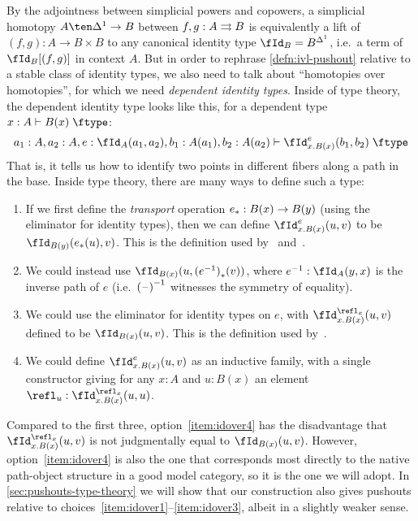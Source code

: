 \documentclass[referee]{psp}
\let\Id\fId
\let\type\fibtype
\renewcommand{\idover}[4][]{\fId_{#1}^{#4}(#2,#3)}
\begin{document}
By the adjointness between simplicial powers and copowers, a simplicial homotopy $A\ten\ivl \to B$ between $f,g:A\rightrightarrows B$ is equivalently a lift of $(f,g):A\to B\times B$ to any canonical identity type $\Id_B = B^\ivl$, i.e.\ a term of $\Id_B[(f,g)]$ in context $A$.
But in order to rephrase \cref{defn:ivl-pushout} relative to a stable class of identity types, we also need to talk about ``homotopies over homotopies'', for which we need \emph{dependent identity types}.
Inside of type theory, the dependent identity type looks like this, for a dependent type $x:A \types B(x)\type$:
\[ a_1:A, a_2:A, e:\id[A]{a_1}{a_2}, b_1:A(a_1), b_2:A(a_2) \types \idover[x.B(x)]{b_1}{b_2}{e} \type \]
That is, it tells us how to identify two points in different fibers along a path in the base.
Inside type theory, there are many ways to define such a type:
\begin{enumerate}\label{idover}
\item If we first define the \emph{transport} operation ${e}_{*}:B(x) \to B(y)$ (using the eliminator for identity types), then we can define $\idover[x.B(x)]{u}{v}{e}$ to be $\id[B(y)]{\transf{e}(u)}{v}$.
  This is the definition used by~\cite{hottbook} and~\cite{hottcoq,bglsss:hottcoq}.\label{item:idover1}
\item We could instead use $\id[B(x)]{u}{\transf{(\opp{e})}(v)}$, where $\opp{e}:\id[A]{y}{x}$ is the inverse path of $e$ (i.e.\ $\mathord{{(\mathord{\hspace{1pt}\text{--}\hspace{1pt}})}^{-1}}$ witnesses the symmetry of equality).\label{item:idover2}
\item We could use the eliminator for identity types on $e$, with $\idover[x.B(x)]{u}{v}{\refl_x}$ defined to be $\id[B(x)]{u}{v}$.
  This is the definition used by~\cite{hottagda}.\label{item:idover3}
\item We could define $\idover[x.B(x)]{u}{v}{e}$ as an inductive family, with a single constructor giving for any $x:A$ and $u:B(x)$ an element $\refl_u : \idover[x.B(x)]{u}{u}{\refl_x}$.\label{item:idover4}
\end{enumerate}
Compared to the first three, option~\ref{item:idover4} has the disadvantage that $\idover[x.B(x)]{u}{v}{\refl_x}$ is not judgmentally equal to $\id[B(x)]{u}{v}$.
However, option~\ref{item:idover4} is also the one that corresponds most directly to the native path-object structure in a good model category, so it is the one we will adopt.
In \cref{sec:pushouts-type-theory} we will show that our construction also gives pushouts relative to choices~\ref{item:idover1}--\ref{item:idover3}, albeit in a slightly weaker sense.
\end{document}
